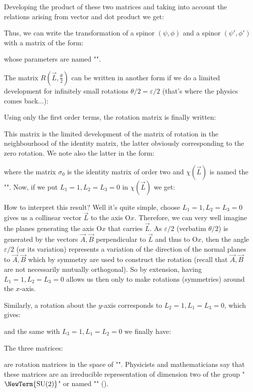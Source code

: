 	Developing the product of these two matrices and taking into account the relations arising from vector and dot product we get:
	
	Thus, we can write the transformation of a spinor $(\psi,\phi)$ and a spinor $(\psi',\phi')$ with a matrix of the form:
	
	whose parameters are named "".
	
	The matrix $R\left(\vec{L},\frac{\theta}{2}\right)$ can be written in another form if we do a limited development for infinitely small rotations $\theta/2=\varepsilon/2$ (that's where the physics comes back...):
	
	Using only the first order terms, the rotation matrix is finally written:
	
	This matrix is the limited development of the matrix of rotation in the neighbourhood of the identity matrix, the latter obviously corresponding to the zero rotation. We note also the latter in the form:
	
	where the matrix $\sigma_0$ is the identity matrix of order two and $\chi(\vec{L})$ is named the "". Now, if we put $L_1=1,L_2=L_3=0$ in $\chi(\vec{L})$ we get:
	
	How to interpret this result? Well it's quite simple, choose $L_1=1,L_2=L_3=0$ gives us a collinear vector $\vec{L}$ to the axis $\text{O}x$. Therefore, we can very well imagine the planes generating the axis $\text{O}x$ that carries $\vec{L}$. As $\varepsilon/2$ (verbatim $\theta/2$) is generated by the vectors $\vec{A},\vec{B}$ perpendicular to $\vec{L}$ and thus to $\text{O}x$, then the angle $\varepsilon/2$ (or its variation) represents a variation of the direction of the normal planes to $\vec{A},\vec{B}$ which by symmetry are used to construct the rotation (recall that $\vec{A},\vec{B}$are not necessarily mutually orthogonal). So by extension, having  $L_1=1,L_2=L_3=0$ allows us then only to make rotations (symmetries) around the $x$-axis.
	
	Similarly, a rotation about the $y$-axis corresponds to $L_2=1,L_1=L_3=0$, which gives:
	
	and the same with $L_3=1,L_1=L_2=0$ we finally have:
	
	The three matrices:
	
	are rotation matrices in the space of "". Physicists and mathematicians say that these matrices are an irreducible representation of dimension two of the group "$\NewTerm{\text{SU} (2)}$" or named  "" ().
	
